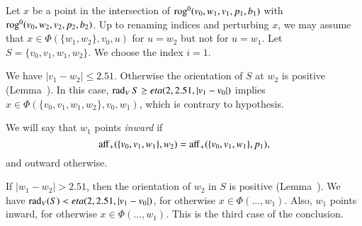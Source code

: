 \begin{tarskidata}
\begin{tarski}
\begin{proved}
Let $x$ be a point in the intersection of ${\operatorname{rog}}^0(v_0,w_1,v_1,p_1,b_1)$ 
with ${\operatorname{rog}}^0(v_0,w_2,v_2,p_2,b_2)$.  Up to renaming indices and perturbing $x$,
we may assume that
$x\in\Phi(\{w_1,w_2\},v_0,u)$ for $u=w_2$ but not for $u=w_1$.  
Let $S=\{v_0,v_1,w_1,w_2\}$.
We choose the index $i=1$.

We have $|v_1-w_2|\le 2.51$. 
Otherwise
the orientation of $S$ at $w_2$ is positive (Lemma~).  In this case, 
  $\operatorname{rad}_V S \ge eta(2,2.51,|v_1-v_0|)$ implies 
$x\in\Phi(\{v_0,v_1,w_1,w_2\},v_0,w_1)$, which is contrary to hypothesis.  

We will say that $w_1$ points {\it inward} if
     $$
     {\operatorname{aff}}_+(\{v_0,v_1,w_1\},w_2) = {\operatorname{aff}}_+(\{v_0,v_1,w_1\},p_1),
     $$
and outward otherwise.

If $|w_1-w_2|> 2.51$, then the orientation of $w_2$ in $S$ is positive (Lemma~).
We have $\operatorname{rad}_V(S) < eta(2,2.51,|v_1-v_0|)$, for otherwise
$x\in\Phi(\ldots,w_1)$.   Also, $w_1$ points inward, for otherwise
$x\in\Phi(\ldots,w_1)$.  This is the third case of the conclusion.


\end{proved}
\end{tarski}
\end{tarskidata}
